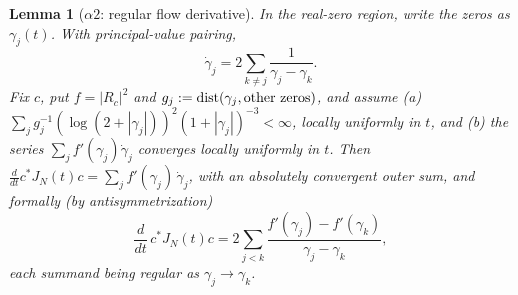 \documentclass[11pt]{amsart}
\newtheorem{lemma}[theorem]{Lemma}
\theoremstyle{definition}
\theoremstyle{remark}
\theoremstyle{definition}
\begin{document}
\begin{lemma}[$\alpha2$: regular flow derivative]\label{lem:alpha2}
In the real-zero region, write the zeros as $\gamma_j(t)$.  With principal-value pairing,
\[
   \dot\gamma_j=2\sum_{k\ne j}\frac1{\gamma_j-\gamma_k}.
\]
Fix $c$, put $f=|R_c|^2$ and $g_j:=\operatorname{dist}(\gamma_j,\textnormal{other zeros})$, and assume
\textnormal{(a)} $\sum_j g_j^{-1}(\log(2+|\gamma_j|))^2(1+|\gamma_j|)^{-3}<\infty$, locally uniformly in
$t$, and \textnormal{(b)} the series $\sum_j f'(\gamma_j)\dot\gamma_j$ converges locally uniformly in
$t$.  Then $\frac{d}{dt}c^*J_N(t)c=\sum_jf'(\gamma_j)\,\dot\gamma_j$, with an absolutely convergent
outer sum, and formally (by antisymmetrization)
\[
   \frac{d}{dt}\,c^*J_N(t)c
   =
   2\sum_{j<k}
   \frac{f'(\gamma_j)-f'(\gamma_k)}{\gamma_j-\gamma_k},
\]
each summand being regular as $\gamma_j\to\gamma_k$.
\end{lemma}
\end{document}
